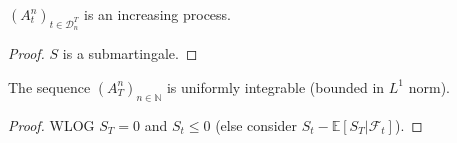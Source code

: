 \begin{lemma}\label{lem:Predict_Part_Increasing}
  $(A^n_t)_{t\in\mathcal{D}_n^T}$ is an increasing process.
\end{lemma}
\begin{proof}
  $S$ is a submartingale.
\end{proof}

\begin{lemma}\label{lem:A_uniform_integrabl}
  The sequence $(A^n_T)_{n\in\mathbb{N}}$ is uniformly integrable (bounded in $L^1$ norm).
\end{lemma}
\begin{proof}
  WLOG $S_T=0$ and $S_t\leq 0$ (else consider $S_t-\mathbb{E}\left[S_T\vert\mathcal{F}_{t}\right]$).


\end{proof}
